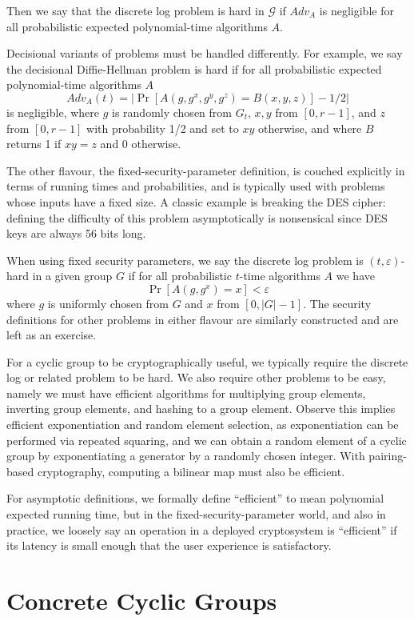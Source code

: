Then we say that the discrete log problem is hard in $\mathcal G$ if $Adv_A$ is
negligible for all probabilistic expected polynomial-time algorithms $A$.

Decisional variants of problems must be handled differently.
For example, we say the decisional Diffie-Hellman problem is hard if
for all probabilistic expected polynomial-time algorithms $A$
\[
Adv_A(t) = | \Pr [ A(g, g^x, g^y, g^z) = B(x, y, z) ] - 1/2 |
\]
is negligible,
where $g$ is randomly chosen from $G_t$, $x, y$ from $[0,r-1]$, and
$z$ from $[0,r-1]$ with probability 1/2 and set to $x y$ otherwise,
and where $B$ returns 1 if $x y = z$ and 0 otherwise.

The other flavour, the fixed-security-parameter definition, is couched
explicitly in terms of running times and probabilities, and is typically used
with problems whose inputs have a fixed size. A classic example is breaking the
DES cipher: defining the difficulty of this problem asymptotically is
nonsensical since DES keys are always 56 bits long.

When using fixed security parameters, we say the discrete
log problem is $(t, \varepsilon)$-hard in a given
group $G$ if for all probabilistic $t$-time algorithms $A$ we have
\[ \Pr [ A(g, g^x) = x ] < \varepsilon \]
where $g$ is uniformly chosen from $G$ and $x$ from $[0, |G| -1]$.
The security definitions for other problems in either flavour
are similarly constructed and are left as an exercise.

For a cyclic group to be cryptographically useful, we typically require the
discrete log or related problem to be hard. We also require other problems to
be easy, namely we must have efficient algorithms for multiplying group
elements, inverting group elements, and hashing to a group element. Observe
this implies efficient exponentiation and random element selection, as
exponentiation can be performed via repeated squaring, and we can obtain a
random element of a cyclic group by exponentiating a generator by a randomly
chosen integer. With pairing-based cryptography, computing a bilinear map must
also be efficient.

For asymptotic definitions, we formally define ``efficient'' to mean polynomial
expected running time, but in the fixed-security-parameter world, and also in
practice, we loosely say an operation in a deployed cryptosystem is
``efficient'' if its latency is small enough that the user experience is
satisfactory.

\section{Concrete Cyclic Groups}


